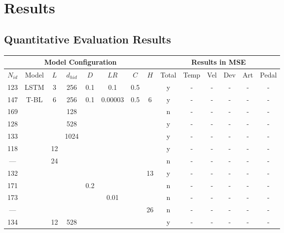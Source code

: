 \chapter{Results} \label{ch:ch5}

\section{Quantitative Evaluation Results}

\begin{table}
    \begin{center}
    \begin{tabular}{| c c | c c c c c c | c c c c c c |}
        \hline 
        \multicolumn{8}{|c|}{Model Configuration} & \multicolumn{6}{c|}{Results in MSE}\\
        \hline
        $N_{id}$ & Model & $L$ & $d_{hid}$ & $D$ & $LR$ & $C$ & $H$ & Total & Temp & Vel & Dev & Art & Pedal \\ 
        \hline 
        123 & LSTM        & 3  & 256  & 0.1 & 0.1 & 0.5 &    &  y & - & - & - & - & - \\ 
        \hline
        147 & T-BL        & 6  & 256  & 0.1 & 0.00003 & 0.5 & 6  &  y & - & - & - & - & - \\
        169 &             &    & 128  &     &         &     &    &  n & - & - & - & - & - \\
        128 &             &    & 528  &     &         &     &    &  y & - & - & - & - & - \\
        133 &             &    & 1024 &     &         &     &    &  y & - & - & - & - & - \\
        118 &             & 12 &      &     &         &     &    &  y & - & - & - & - & - \\
        --- &             & 24 &      &     &         &     &    &  n & - & - & - & - & - \\
        132 &             &    &      &     &         &     & 13 &  y & - & - & - & - & - \\
        171 &             &    &      & 0.2 &         &     &    &  n & - & - & - & - & - \\
        173 &             &    &      &     & 0.01    &     &    &  n & - & - & - & - & - \\
        --- &             &    &      &     &         &     & 26 &  n & - & - & - & - & - \\
        134 &             & 12 & 528  &     &         &     &    &  y & - & - & - & - & - \\

\end{tabular}
\end{center}
\end{table}
